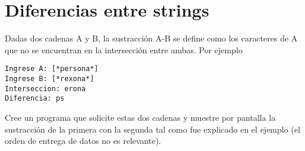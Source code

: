 \section{Diferencias entre strings}
Dadas dos cadenas A y B, la sustracción A-B se define como los caracteres de A que no se encuentran en la intersección entre ambas. Por ejemplo

\begin{lstlisting}[style=consola]
Ingrese A: [*persona*]
Ingrese B: [*rexona*]
Interseccion: erona
Diferencia: ps
\end{lstlisting}

Cree un programa que solicite estas dos cadenas y muestre por pantalla la sustracción de la primera con la segunda tal como fue explicado en el ejemplo (el orden de entrega de datos no es relevante).